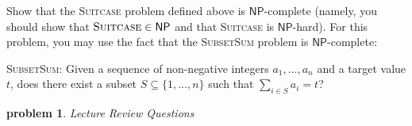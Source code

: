 \documentclass[10pt]{article}
\newtheorem{problem}{\sc\color{cit}problem}
\newcommand{\points}[1]{\normalfont{[#1 points]}}
\begin{document}
  Show that the \textsc{Suitcase} problem defined above is $\mathsf{NP}$-complete (namely, you should
  show that $\textsc{Suitcase} \in \mathsf{NP}$ and that \textsc{Suitcase} is $\mathsf{NP}$-hard). For this
  problem, you may use the fact that the \textsc{SubsetSum} problem is $\mathsf{NP}$-complete:

  \begin{minipage}[t]{\linewidth}
  \begin{framed}
    \textsc{SubsetSum}: Given a sequence of non-negative integers $a_1, \ldots, a_n$
    and a target value $t$, does there exist
    a subset $S \subseteq \{ 1, \ldots, n \}$ such that $\sum_{i \in S} a_i = t$?
  \end{framed}
  \end{minipage}


\newpage
\begin{problem} Lecture Review Questions \points{20}\end{problem}
\end{document}
